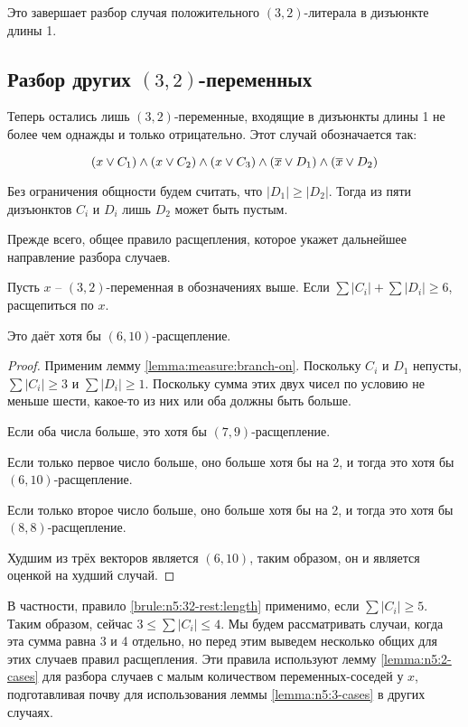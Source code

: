 Это завершает разбор случая положительного $(3,2)$-литерала в дизъюнкте длины 1.

\subsection{Разбор других $(3,2)$-переменных}
\label{subsec:n5:32-rest}

Теперь остались лишь $(3,2)$-переменные, входящие в дизъюнкты длины 1 не более чем однажды и только отрицательно. Этот случай обозначается так:

$$
 (x \vee C_1) \wedge (x \vee C_2) \wedge (x \vee C_3) \wedge (\overline{x} \vee D_1) \wedge (\overline{x} \vee D_2)
$$

Без ограничения общности будем считать, что $|D_1| \geq |D_2|$. Тогда из пяти дизъюнктов $C_i$ и $D_i$ лишь $D_2$ может быть пустым.

Прежде всего, общее правило расщепления, которое укажет дальнейшее направление разбора случаев.

\begin{brule}
 Пусть $x$ -- $(3,2)$-переменная в обозначениях выше. Если $\sum |C_i| + \sum |D_i| \geq 6$, расщепиться по $x$.

 Это даёт хотя бы $(6,10)$-расщепление.
 \label{brule:n5:32-rest:length}
\end{brule}

\begin{proof}
 Применим лемму \ref{lemma:measure:branch-on}. Поскольку $C_i$ и $D_1$ непусты, $\sum |C_i| \geq 3$ и $\sum |D_i| \geq 1$. Поскольку сумма этих двух чисел по условию не меньше шести, какое-то из них или оба должны быть больше.

 Если оба числа больше, это хотя бы $(7,9)$-расщепление.

 Если только первое число больше, оно больше хотя бы на 2, и тогда это хотя бы $(6,10)$-расщепление.

 Если только второе число больше, оно больше хотя бы на 2, и тогда это хотя бы $(8,8)$-расщепление.

 Худшим из трёх векторов является $(6,10)$, таким образом, он и является оценкой на худший случай.
\end{proof}

В частности, правило \ref{brule:n5:32-rest:length} применимо, если $\sum |C_i| \geq 5$. Таким образом, сейчас $3 \leq \sum |C_i| \leq 4$. Мы будем рассматривать случаи, когда эта сумма равна 3 и 4 отдельно, но перед этим выведем несколько общих для этих случаев правил расщепления.
Эти правила используют лемму \ref{lemma:n5:2-cases} для разбора случаев с малым количеством переменных-соседей у $x$, подготавливая почву для использования леммы \ref{lemma:n5:3-cases} в других случаях.

